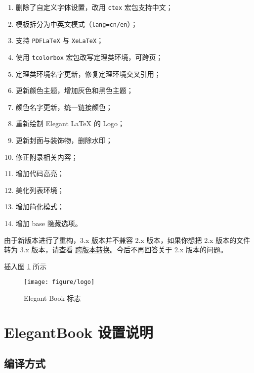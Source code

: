 \documentclass[cn,11pt,fancy,hide]{elegantbook}
\providecommand{\tightlist}{%
  \setlength{\itemsep}{0pt}\setlength{\parskip}{0pt}}
\begin{document}
\begin{enumerate}
\def\labelenumi{\arabic{enumi}.}
\tightlist
\item
  删除了自定义字体设置，改用 \texttt{ctex} 宏包支持中文；
\item
  模板拆分为中英文模式（\texttt{lang=cn/en}）；
\item
  支持 \texttt{PDFLaTeX} 与 \texttt{XeLaTeX}；
\item
  使用 \texttt{tcolorbox} 宏包改写定理类环境，可跨页；
\item
  定理类环境名字更新，修复定理环境交叉引用；
\item
  更新颜色主题，增加灰色和黑色主题；
\item
  颜色名字更新，统一链接颜色；
\item
  重新绘制 Elegant LaTeX 的 Logo；
\item
  更新封面与装饰物，删除水印；
\item
  修正附录相关内容；
\item
  增加代码高亮；
\item
  美化列表环境；
\item
  增加简化模式；
\item
  增加 base 隐藏选项。
\end{enumerate}

\begin{note}

由于新版本进行了重构，3.x 版本并不兼容 2.x 版本，如果你想把 2.x 版本的文件转为 3.x 版本，请查看 \href{https://github.com/ElegantLaTeX/ElegantBook/wiki/convert}{跨版本转换}。今后不再回答关于 2.x 版本的问题。

\end{note}

插入图 \ref{fig:elegantbook-logo} 所示

\begin{figure}

{\centering \texttt{[image: figure/logo]} 

}

\caption{Elegant Book 标志}\label{fig:elegantbook-logo}
\end{figure}

\hypertarget{elegantbook--1}{%
\chapter{ElegantBook 设置说明}\label{elegantbook--1}}

\hypertarget{section}{%
\section{编译方式}\label{section}}
\end{document}
